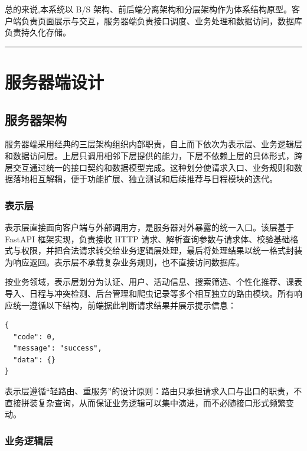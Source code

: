 \documentclass[UTF8,a4paper,12pt,fontset=none]{ctexrep}
\begin{document}
总的来说,本系统以 B/S 架构、前后端分离架构和分层架构作为体系结构原型。客户端负责页面展示与交互，服务器端负责接口调度、业务处理和数据访问，数据库负责持久化存储。

\begin{center}\rule{0.5\linewidth}{0.5pt}\end{center}

\chapter{服务器端设计}\label{ux670dux52a1ux5668ux7aefux8bbeux8ba1}

\section{服务器架构}\label{ux670dux52a1ux5668ux67b6ux6784}

服务器端采用经典的三层架构组织内部职责，自上而下依次为表示层、业务逻辑层和数据访问层。上层只调用相邻下层提供的能力，下层不依赖上层的具体形式，跨层交互通过统一的接口契约和数据模型完成。这种划分使请求入口、业务规则和数据落地相互解耦，便于功能扩展、独立测试和后续推荐与日程模块的迭代。

\subsection{表示层}\label{ux8868ux793aux5c42}

表示层直接面向客户端与外部调用方，是服务器对外暴露的统一入口。该层基于 FastAPI 框架实现，负责接收 HTTP 请求、解析查询参数与请求体、校验基础格式与权限，并把合法请求转交给业务逻辑层处理，最后将处理结果以统一格式封装为响应返回。表示层不承载复杂业务规则，也不直接访问数据库。

按业务领域，表示层划分为认证、用户、活动信息、搜索筛选、个性化推荐、课表导入、日程与冲突检测、后台管理和爬虫记录等多个相互独立的路由模块。所有响应统一遵循以下结构，前端据此判断请求结果并展示提示信息：

\begin{verbatim}
{
  "code": 0,
  "message": "success",
  "data": {}
}
\end{verbatim}

表示层遵循``轻路由、重服务''的设计原则：路由只承担请求入口与出口的职责，不直接拼装复杂查询，从而保证业务逻辑可以集中演进，而不必随接口形式频繁变动。

\subsection{业务逻辑层}\label{ux4e1aux52a1ux903bux8f91ux5c42}
\end{document}
